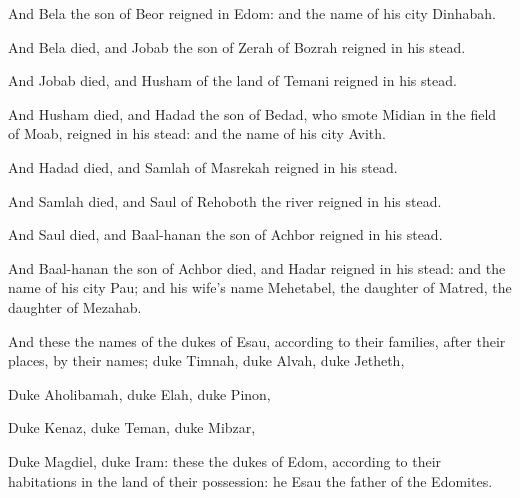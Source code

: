 {And
Bela the
son of
Beor
reigned in
Edom: and the
name of his
city
{}
Dinhabah.

And
Bela
died, and
Jobab the
son of
Zerah of
Bozrah
reigned in his stead.

And
Jobab
died, and
Husham of the
land of
Temani
reigned in his stead.

And
Husham
died, and
Hadad the
son of
Bedad, who
smote
Midian in the
field of
Moab,
reigned in his stead: and the
name of his
city
{}
Avith.

And
Hadad
died, and
Samlah of
Masrekah
reigned in his stead.

And
Samlah
died, and
Saul of
Rehoboth
{} the
river
reigned in his stead.

And
Saul
died, and
Baal-hanan the
son of
Achbor
reigned in his stead.

And
Baal-hanan the
son of
Achbor
died, and
Hadar
reigned in his stead: and the
name of his
city
{}
Pau; and his
wife’s
name
{}
Mehetabel, the
daughter of
Matred, the
daughter of
Mezahab.

And these
{} the
names of the
dukes
{} of
Esau, according to their
families, after their
places, by their
names;
duke
Timnah,
duke
Alvah,
duke
Jetheth,

Duke
Aholibamah,
duke
Elah,
duke
Pinon,

Duke
Kenaz,
duke
Teman,
duke
Mibzar,

Duke
Magdiel,
duke
Iram: these
{} the
dukes of
Edom, according to their
habitations in the
land of their
possession: he
{}
Esau the
father of the
Edomites.




\par }

